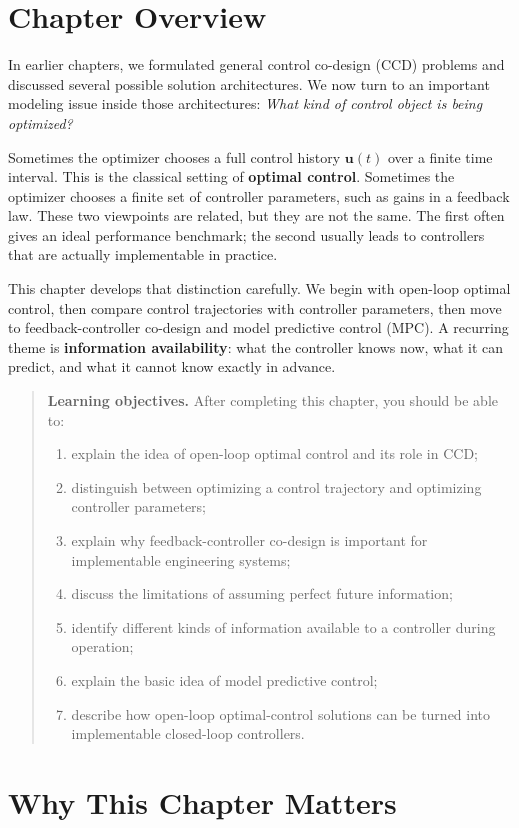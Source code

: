 \documentclass[11pt]{article}
\newcommand{\vect}[1]{\boldsymbol{#1}}
\newcommand{\uvec}{\vect{u}}
\newenvironment{learningobjectives}{%
\begin{quote}\textbf{Learning objectives.} After completing this chapter, you should be able to:
\begin{enumerate}[leftmargin=1.4em,itemsep=0.35em,topsep=0.5em]
}{\end{enumerate}\end{quote}}
\begin{document}
\section*{Chapter Overview}

In earlier chapters, we formulated general control co-design (CCD) problems and discussed several possible solution architectures. We now turn to an important modeling issue inside those architectures: \emph{What kind of control object is being optimized?}

Sometimes the optimizer chooses a full control history $\uvec(t)$ over a finite time interval. This is the classical setting of \textbf{optimal control}. Sometimes the optimizer chooses a finite set of controller parameters, such as gains in a feedback law. These two viewpoints are related, but they are not the same. The first often gives an ideal performance benchmark; the second usually leads to controllers that are actually implementable in practice.

This chapter develops that distinction carefully. We begin with open-loop optimal control, then compare control trajectories with controller parameters, then move to feedback-controller co-design and model predictive control (MPC). A recurring theme is \textbf{information availability}: what the controller knows now, what it can predict, and what it cannot know exactly in advance.

\begin{learningobjectives}
  \item explain the idea of open-loop optimal control and its role in CCD;
  \item distinguish between optimizing a control trajectory and optimizing controller parameters;
  \item explain why feedback-controller co-design is important for implementable engineering systems;
  \item discuss the limitations of assuming perfect future information;
  \item identify different kinds of information available to a controller during operation;
  \item explain the basic idea of model predictive control;
  \item describe how open-loop optimal-control solutions can be turned into implementable closed-loop controllers.
\end{learningobjectives}

\section{Why This Chapter Matters}
\end{document}
